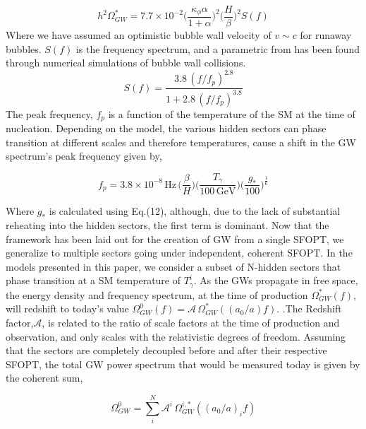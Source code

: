\documentclass[nofootinbib,twocolumn,preprintnumbers]{revtex4-1}
\begin{document}
\begin{equation}
h^2\Omega_{GW}^* = 7.7\times 10^{-2} \bigg( \frac{\kappa_{\phi} \alpha}{1 + \alpha} \bigg)^2 \bigg( \frac{H}{\beta} \bigg)^2  S(f)
\end{equation}
Where we have assumed an optimistic bubble wall velocity of $v \sim c$ for runaway bubbles. $S(f)$ is the  frequency spectrum, and a parametric from has been found through numerical simulations of bubble wall collisions.
\begin{equation}
S(f) = \frac{3.8 \,(f/f_p)^{2.8}}{1 + 2.8\,(f/f_p)^{3.8}}
\end{equation}
The peak frequency, $f_{p}$ is a function of the temperature of the SM at the time of nucleation. Depending on the model, the various hidden sectors can phase transition at different scales and therefore temperatures, cause a shift in the GW spectrum's peak frequency given by,

\begin{equation}
f_{p} = 3.8 \times 10^{-8} \, \textrm{Hz}\, \bigg( \frac{\beta}{H}\bigg)\bigg(\frac{T_{\gamma}}{100 \, \textrm{GeV}}\bigg)\bigg(\frac{g_{*}}{100}\bigg)^{\frac{1}{6}}
\end{equation}

 Where $g_*$  is calculated using Eq.(12), although, due to the lack of substantial reheating into the hidden sectors, the first term is dominant. Now that the framework has been laid out for the creation of GW from a single SFOPT, we generalize to multiple sectors going under independent, coherent SFOPT. In the models presented in this paper, we consider a subset of N-hidden sectors that phase transition at a SM temperature of $T_{\gamma}^{i}$. As the GWs propagate in free space, the energy density and frequency spectrum, at the time of production $\Omega_{GW}^{*}(f)$, will redshift to today's value $\Omega_{GW}^{0}(f) = \mathcal{A}\, \Omega_{GW}^{*}((a_{0}/a) f) $. .The Redshift factor,$\mathcal{A}$, is related to the ratio of scale factors at the time of production and observation, and only scales with the relativistic degrees of freedom.  Assuming that the sectors are completely decoupled before and after their respective SFOPT, the total GW power spectrum that would be measured today is given by the coherent sum,

\begin{equation}
\Omega_{GW}^{0} =  \sum_{i}^{N} \mathcal{A}^{i}\, \Omega_{GW}^{i,*}((a_{0}/a)_{i} f) 
\end{equation}
\end{document}
